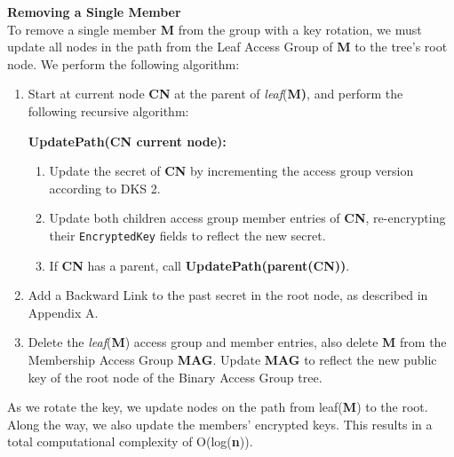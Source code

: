 \documentclass[oneside, 12pt]{article}
\begin{document}
\noindent\textbf{Removing a Single Member}\\
\noindent To remove a single member \textbf{M} from the group with a key rotation, we must update all nodes in the path from the Leaf Access Group of \textbf{M} to the tree's root node. We perform the following algorithm:

\begin{enumerate}
  \item Start at current node \textbf{CN} at the parent of \textit{leaf}(\textbf{M)}, and perform the following recursive algorithm:

\begin{tcolorbox}
\begin{footnotesize}
\textbf{UpdatePath(CN current node):}
  \begin{enumerate}
    \item Update the secret of \textbf{CN} by incrementing the access group version according to DKS 2.
    \item Update both children access group member entries of \textbf{CN}, re-encrypting their \texttt{EncryptedKey} fields to reflect the new secret.
    \item If \textbf{CN} has a parent, call \textbf{UpdatePath(parent(CN))}.
  \end{enumerate}
\end{footnotesize}
\end{tcolorbox}

  \item Add a Backward Link to the past secret in the root node, as described in Appendix A.

  \item Delete the \textit{leaf}(\textbf{M}) access group and member entries, also delete \textbf{M} from the Membership Access Group \textbf{MAG}. Update \textbf{MAG} to reflect the new public key of the root node of the Binary Access Group tree.

\end{enumerate}

\noindent As we rotate the key, we update nodes on the path from leaf(\textbf{M}) to the root. Along the way, we also update the members' encrypted keys. This results in a total computational complexity of O(log(\textbf{n})).
\end{document}
